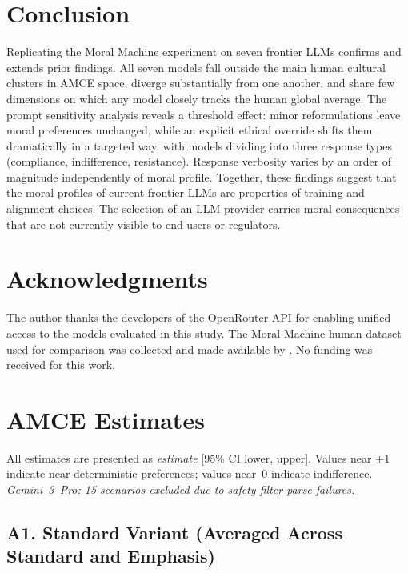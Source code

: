 \documentclass[11pt,letterpaper]{article}
\begin{document}
\section{Conclusion}

Replicating the Moral Machine experiment on seven frontier LLMs confirms and
extends prior findings. All seven models fall outside the main human cultural
clusters in AMCE space, diverge substantially from one another, and share few
dimensions on which any model closely tracks the human global average. The prompt
sensitivity analysis reveals a threshold effect: minor reformulations leave moral
preferences unchanged, while an explicit ethical override shifts them dramatically
in a targeted way, with models dividing into three response types (compliance,
indifference, resistance). Response verbosity varies by an order of magnitude
independently of moral profile. Together, these findings suggest that the moral
profiles of current frontier LLMs are properties of training and alignment
choices. The selection of an LLM provider carries moral consequences that are not
currently visible to end users or regulators.

\section*{Acknowledgments}

The author thanks the developers of the OpenRouter API for enabling unified access
to the models evaluated in this study. The Moral Machine human dataset used for
comparison was collected and made available by \citet{awad2018}. No funding was
received for this work.

\appendix
\section{AMCE Estimates}

All estimates are presented as \textit{estimate} [95\% CI lower, upper].
Values near $\pm 1$ indicate near-deterministic preferences; values near~0
indicate indifference. \textit{Gemini~3~Pro: 15 scenarios excluded due to
safety-filter parse failures.}

\subsection*{A1. Standard Variant (Averaged Across Standard and Emphasis)}
\end{document}
